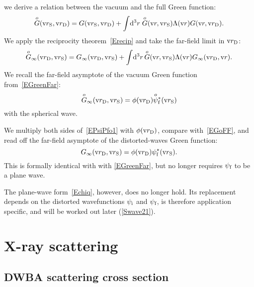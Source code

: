 we derive a relation between the vacuum and the full Green function:
\begin{equation}\label{EGGo1}
  \Go(\rS,\rD) = G(\rS,\rD) + \int\!\d^3r\;\Go(\r,\rS)\Lambda(\r)G(\r,\rD).
\end{equation}
We apply the reciprocity theorem~\cref{Erecip} and take the far-field limit in $\rD$:
\begin{equation}\label{EGoFF}
  \Go_\infty(\rD,\rS) = G_\infty(\rD,\rS) + \int\!\d^3r\, \Go(\r,\rS)\Lambda(\r) G_\infty(\rD,\r).
\end{equation}
We recall the far-field asymptote of the vacuum Green function from~\cref{EGreenFar}:
\begin{equation}
  \Go_\infty(\rD,\rS) = \phi(\rD)\pfoc(\rS)
\end{equation}
with the spherical wave.


We multiply both sides of~\cref{EPsiPfo1} with $\phi(\rD)$,
compare with~\cref{EGoFF},
and read off the far-field asymptote of the distorted-waves Green function:
\begin{equation}\label{EGiDWBA}
  G_\infty(\rD,\rS) = \phi(\rD)\psi^*_\sf(\rS).
\end{equation}
This is formally identical with with \cref{EGreenFar},
but no longer requires $\psi_\sf$ to be a plane wave.
%

%
%
%
The plane-wave form~\cref{Echiq}, however, does no longer hold.
Its replacement depends on the distorted wavefunctions
$\psi_\si$ and $\psi_\sf$,
is therefore application specific,
and will be worked out later (\cref{Swave21}).

%

\section{X-ray scattering}\label{SXray}
%


\subsection{DWBA scattering cross section}\label{SXscasol}

